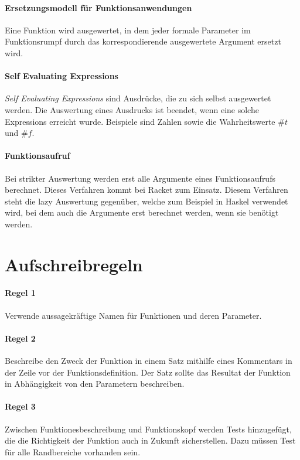 \documentclass[../main.tex]{subfiles}
\begin{document}
        \paragraph{Ersetzungsmodell für Funktionsanwendungen}
		\label{section:Programmierung:Auswertungsregeln:ErsetzungsmodellFunktionsanwendungen}
			Eine Funktion wird ausgewertet, in dem jeder formale Parameter im Funktionsrumpf durch das korrespondierende ausgewertete Argument ersetzt wird.
            
        \paragraph{Self Evaluating Expressions}
            \emph{Self Evaluating Expressions} sind Ausdrücke, die zu sich selbst ausgewertet werden. Die Auswertung eines Ausdrucks ist beendet, wenn eine solche Expressions erreicht wurde. Beispiele sind Zahlen sowie die Wahrheitswerte $\#t$ und $\#f$.
            
        \paragraph{Funktionsaufruf}
            Bei strikter Auswertung werden erst alle Argumente eines Funktionsaufrufs berechnet. Dieses Verfahren kommt bei Racket zum Einsatz. Diesem Verfahren steht die lazy Auswertung gegenüber, welche zum Beispiel in Haskel verwendet wird, bei dem auch die Argumente erst berechnet werden, wenn sie benötigt werden.   
            
    \section{Aufschreibregeln}
        \paragraph{Regel 1}
            Verwende aussagekräftige Namen für Funktionen und deren Parameter.
        
        \paragraph{Regel 2}
            Beschreibe den Zweck der Funktion in einem Satz mithilfe eines Kommentars in der Zeile vor der Funktionsdefinition. Der Satz sollte das Resultat der Funktion in Abhängigkeit von den Parametern beschreiben.
            
        \paragraph{Regel 3}
            Zwischen Funktionesbeschreibung und Funktionskopf werden Tests hinzugefügt, die die Richtigkeit der Funktion auch in Zukunft sicherstellen. Dazu müssen Test für alle Randbereiche vorhanden sein.
            
\end{document}
